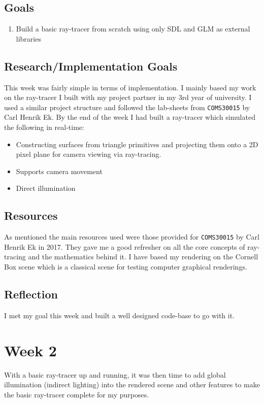 \documentclass[conference]{IEEEtran}
\begin{document}
\subsection{Goals}
\begin{enumerate}
\item Build a basic ray-tracer from scratch using only SDL and GLM as external libraries
\end{enumerate}

\subsection{Research/Implementation Goals}
This week was fairly simple in terms of implementation. I mainly based my work on the ray-tracer I built with my project partner in my 3rd year of university. I used a similar project structure and followed the lab-sheets from  \verb|COMS30015| by Carl Henrik Ek. By the end of the week I had built a ray-tracer which simulated the following in real-time:

\begin{itemize}
\item Constructing surfaces from triangle primitives and projecting them onto a 2D pixel plane for camera viewing via ray-tracing.
\item Supports camera movement
\item Direct illumination 
\end{itemize}

\subsection{Resources}
As mentioned the main resources used were those provided for \verb|COMS30015| by Carl Henrik Ek in 2017. They gave me a good refresher on all the core concepts of ray-tracing and the mathematics behind it. I have based my rendering on the Cornell Box scene which is a classical scene for testing computer graphical renderings. 

\subsection{Reflection}
I met my goal this week and built a well designed code-base to go with it.

\section*{Week 2}
With a basic ray-tracer up and running, it was then time to add global illumination (indirect lighting) into the rendered scene and other features to make the basic ray-tracer complete for my purposes.
\end{document}
